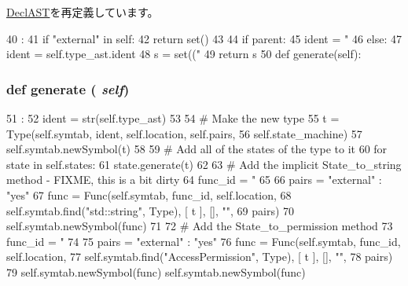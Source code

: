 \hyperlink{classslicc_1_1ast_1_1DeclAST_1_1DeclAST_a35b1a87f6fcbddeb5b793b0e415765f8}{DeclAST}を再定義しています。


\begin{DoxyCode}
40                                 :
41         if "external" in self:
42             return set()
43 
44         if parent:
45             ident = "%
46         else:
47             ident = self.type_ast.ident
48         s = set(("%
49         return s
50 
    def generate(self):
\end{DoxyCode}
\hypertarget{classslicc_1_1ast_1_1StateDeclAST_1_1StateDeclAST_a4555d1cee0dccf3942ea35fe86de2e8e}{
\subsubsection[{generate}]{\setlength{\rightskip}{0pt plus 5cm}def generate ( {\em self})}}
\label{classslicc_1_1ast_1_1StateDeclAST_1_1StateDeclAST_a4555d1cee0dccf3942ea35fe86de2e8e}



\begin{DoxyCode}
51                       :
52         ident = str(self.type_ast)
53 
54         # Make the new type
55         t = Type(self.symtab, ident, self.location, self.pairs,
56                  self.state_machine)
57         self.symtab.newSymbol(t)
58 
59         # Add all of the states of the type to it
60         for state in self.states:
61             state.generate(t)
62 
63         # Add the implicit State_to_string method - FIXME, this is a bit dirty
64         func_id = "%
65 
66         pairs = { "external" : "yes" }
67         func = Func(self.symtab, func_id, self.location,
68                     self.symtab.find("std::string", Type), [ t ], [], "",
69                     pairs)
70         self.symtab.newSymbol(func)
71 
72         # Add the State_to_permission method
73         func_id = "%
74 
75         pairs = { "external" : "yes" }
76         func = Func(self.symtab, func_id, self.location,
77                     self.symtab.find("AccessPermission", Type), [ t ], [], "",
78                     pairs)
79         self.symtab.newSymbol(func)
        self.symtab.newSymbol(func)
\end{DoxyCode}


